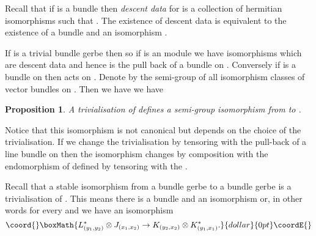 \documentclass[a4paper,reqno]{amsart}
\DeclareMathOperator{\Mod}{Mod}
\DeclareMathOperator{\Bun}{Bun}
\theoremstyle{plain}
\newtheorem{proposition}[theorem]{Proposition}
\theoremstyle{definition}
\theoremstyle{remark}
\numberwithin{equation}{section}
\numberwithin{figure}{section}
\providecommand{\<}{\langle}
\renewcommand{\>}{\rangle}
\begin{document}
Recall that if \coordHE{} is a bundle then {\em descent data} \cite{Bry}
for \coordHE{} is a collection of   hermitian isomorphisms
\coordHE{} such that \coordHE{}.  The existence of descent data
is equivalent to the existence of a bundle \coordHE{} and an
isomorphism \coordHE{}.

If \coordHE{} is a trivial bundle gerbe then \coordHE{}
so if \coordHE{} is an \coordHE{} module we have isomorphisms \coordHE{} which are descent data and hence \coordHE{} is the
pull back of a bundle on \coordHE{}.
     Conversely
if \coordHE{} is a bundle on \coordHE{} then \coordHE{} acts on \coordHE{}. Denote
by \myHighlight{$\Bun(M)$}\coordHE{} the semi-group of all isomorphism classes of vector
bundles on \coordHE{}. Then we have
we have
\begin{proposition}
\label{prop:trivialcase}
A trivialisation of  \coordHE{} defines  a semi-group
isomorphism from \myHighlight{$\Mod(L)$}\coordHE{} to \myHighlight{$\Bun(M)$}\coordHE{}.
\end{proposition}


Notice that this isomorphism is not canonical but depends on the choice
of the trivialisation. If we change the trivialisation by tensoring
with the pull-back of a line bundle \coordHE{} on \coordHE{} then the isomorphism changes
by composition with the endomorphism of \myHighlight{$\Bun(M)$}\coordHE{} defined by tensoring
with the \coordHE{}.

Recall that a stable isomorphism from a bundle gerbe \coordHE{}
to a bundle gerbe \coordHE{} is a trivialisation of \coordHE{}. This
means there is a bundle \coordHE{} and an isomorphism
\coordHE{} or, in other words for
every \coordHE{} and \coordHE{} we have an isomorphism
$$\coord{}\boxMath{
     L_{(y_1, y_2)}^*\otimes J_{(x_1, x_2)}
\to K_{(y_2, x_2)} \otimes K_{(y_1, x_1)}^*.
}{dollar}{0pt}\coordE{}$$
\end{document}
